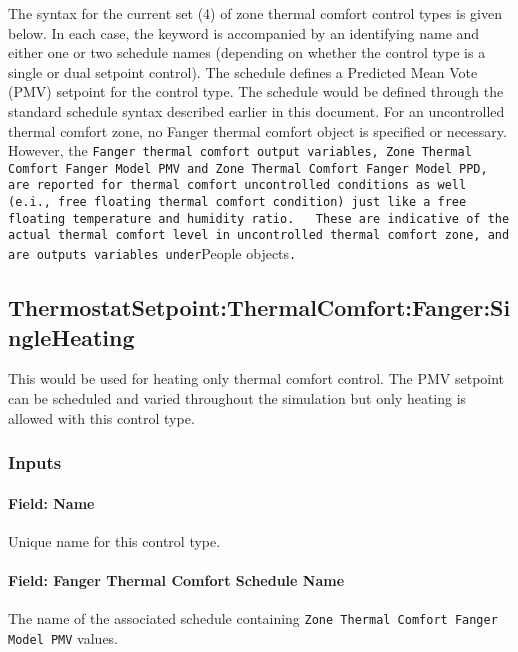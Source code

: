 The syntax for the current set (4) of zone thermal comfort control types is given below. In each case, the keyword is accompanied by an identifying name and either one or two schedule names (depending on whether the control type is a single or dual setpoint control). The schedule defines a Predicted Mean Vote (PMV) setpoint for the control type. The schedule would be defined through the standard schedule syntax described earlier in this document. For an uncontrolled thermal comfort zone, no Fanger thermal comfort object is specified or necessary. However, the \lstinline!Fanger thermal comfort output variables, Zone Thermal Comfort Fanger Model PMV and Zone Thermal Comfort Fanger Model PPD, are reported for thermal comfort uncontrolled conditions as well (e.i., free floating thermal comfort condition) just like a free floating temperature and humidity ratio.   These are indicative of the actual thermal comfort level in uncontrolled thermal comfort zone, and are outputs variables under!People objects\lstinline!.!

\subsection{ThermostatSetpoint:ThermalComfort:Fanger:SingleHeating}\label{thermostatsetpointthermalcomfortfangersingleheating}

This would be used for heating only thermal comfort control. The PMV setpoint can be scheduled and varied throughout the simulation but only heating is allowed with this control type.

\subsubsection{Inputs}\label{inputs-10-023}

\paragraph{Field: Name}\label{field-name-8-024}

Unique name for this control type.

\paragraph{Field: Fanger Thermal Comfort Schedule Name}\label{field-fanger-thermal-comfort-schedule-name}

The name of the associated schedule containing \lstinline!Zone Thermal Comfort Fanger Model PMV! values.

